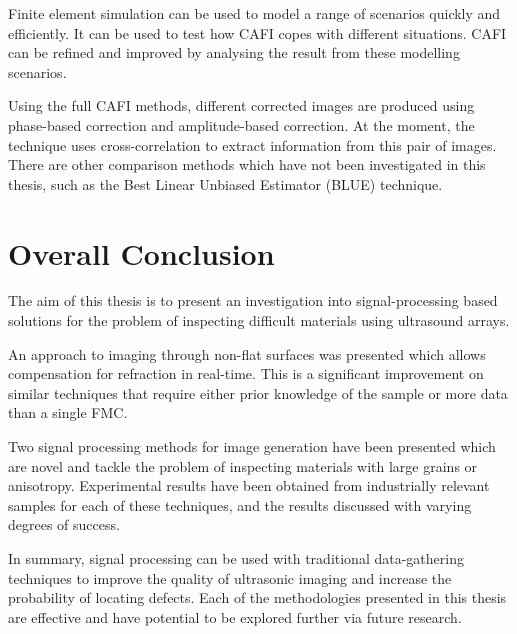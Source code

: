 Finite element simulation can be used to model a range of scenarios quickly and efficiently. It can be used to test how CAFI copes with different situations. CAFI can be refined and improved by analysing the result from these modelling scenarios.

Using the full CAFI methods, different corrected images are produced using phase-based correction and amplitude-based correction. At the moment, the technique uses cross-correlation to extract information from this pair of images. There are other comparison methods which have not been investigated in this thesis, such as the Best Linear Unbiased Estimator (BLUE) technique\cite{fjortoft_optimal_1998}.

\section{Overall Conclusion}
The aim of this thesis is to present an investigation into signal-processing based solutions for the problem of inspecting difficult materials using ultrasound arrays.

An approach to imaging through non-flat surfaces was presented which allows compensation for refraction in real-time. This is a significant improvement on similar techniques that require either prior knowledge of the sample or more data than a single FMC.

Two signal processing methods for image generation have been presented which are novel and tackle the problem of inspecting materials with large grains or anisotropy. Experimental results have been obtained from industrially relevant samples for each of these techniques, and the results discussed with varying degrees of success. 

In summary, signal processing can be used with traditional data-gathering techniques to improve the quality of ultrasonic imaging and increase the probability of locating defects. Each of the methodologies presented in this thesis are effective and have potential to be explored further via future research.



